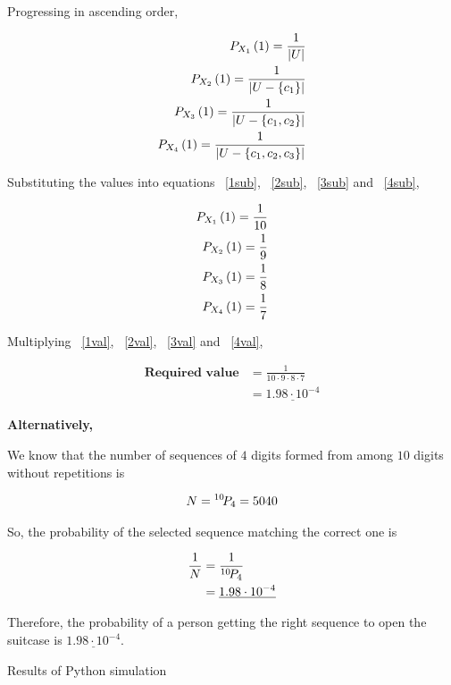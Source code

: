 \documentclass[journal,12pt,twocolumn]{IEEEtran}
\begin{document}
	
	Progressing in ascending order,
	
	
	\begin{align}
		P_{X_1}\left(1\right) = \frac{1}{\left\vert U\right\vert} 
			\label{1sub} \\
		P_{X_2}\left(1\right) = \frac{1}{\left\vert U - \left\{c_1\right\}\right\vert} 
			\label{2sub} \\
		P_{X_3}\left(1\right) = \frac{1}{\left\vert U - \left\{c_1, c_2\right\}\right\vert} 
			\label{3sub} \\
		P_{X_4}\left(1\right) = \frac{1}{\left\vert U - \left\{c_1, c_2, c_3\right\}\right\vert} 
			\label{4sub}
	\end{align}
	
	
	Substituting the values into equations ~\eqref{1sub}, ~\eqref{2sub}, ~\eqref{3sub} and ~\eqref{4sub}, 
	
	
	\begin{align}
		P_{X_1}\left(1\right) = \frac{1}{10} 
			\label{1val} \\
		P_{X_2}\left(1\right) = \frac{1}{9} 
			\label{2val} \\
		P_{X_3}\left(1\right) = \frac{1}{8} 
			\label{3val} \\
		P_{X_4}\left(1\right) = \frac{1}{7} 
			\label{4val}
	\end{align}
	
	
	Multiplying ~\eqref{1val}, ~\eqref{2val}, ~\eqref{3val} and ~\eqref{4val},
	
	
	\begin{align}
		\textbf{Required value}  &= \frac{1}{10 \cdot 9 \cdot 8 \cdot 7} \nonumber \\
						&= \underline{1.98 \cdot 10^{-4}} 
						\label{result}
	\end{align}
	
	
	\textbf{Alternatively,}
	
	
	We know that the number of sequences of $4$ digits formed from among $10$ digits without repetitions is
	
	
	\begin{align}
		N = {{}^{10}\mkern-3muP_{4}} = 5040
			\label{formula}
	\end{align}
	
	
	So, the probability of the selected sequence matching the correct one is 
	
	
	\begin{align}
		\frac{1}{N} &= \frac{1}{{{}^{10}\mkern-3muP_{4}}} \nonumber \\
				&= \underline{1.98 \cdot 10^{-4}}
				\label{alt_result}
	\end{align}
	
	
	Therefore, the probability of a person getting the right sequence to open the suitcase is $ \underline{1.98 \cdot 10^{-4}}$.
	
	
	\begin{table}[t]
	
		\centering
		\caption{Results of Python simulation}
		
		
		\label{the_table}
		
	\end{table}
		
	
\end{document}
